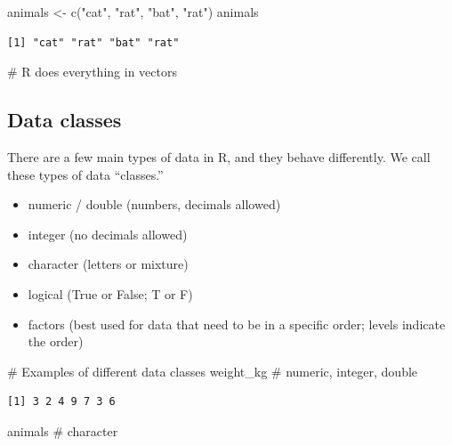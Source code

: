 \documentclass[
  letterpaper,
  DIV=11,
  numbers=noendperiod]{scrartcl}
\newenvironment{Shaded}{\begin{snugshade}}{\end{snugshade}}
\newcommand{\CommentTok}[1]{\textcolor[rgb]{0.37,0.37,0.37}{#1}}
\newcommand{\FunctionTok}[1]{\textcolor[rgb]{0.28,0.35,0.67}{#1}}
\newcommand{\NormalTok}[1]{\textcolor[rgb]{0.00,0.23,0.31}{#1}}
\newcommand{\OtherTok}[1]{\textcolor[rgb]{0.00,0.23,0.31}{#1}}
\newcommand{\StringTok}[1]{\textcolor[rgb]{0.13,0.47,0.30}{#1}}
\providecommand{\tightlist}{%
  \setlength{\itemsep}{0pt}\setlength{\parskip}{0pt}}
\begin{document}
\begin{Shaded}
\begin{Highlighting}[]
\NormalTok{animals }\OtherTok{\textless{}{-}} \FunctionTok{c}\NormalTok{(}\StringTok{"cat"}\NormalTok{, }\StringTok{"rat"}\NormalTok{, }\StringTok{"bat"}\NormalTok{, }\StringTok{"rat"}\NormalTok{)}
\NormalTok{animals}
\end{Highlighting}
\end{Shaded}

\begin{verbatim}
[1] "cat" "rat" "bat" "rat"
\end{verbatim}

\begin{Shaded}
\begin{Highlighting}[]
\CommentTok{\# R does everything in vectors}
\end{Highlighting}
\end{Shaded}

\subsection{Data classes}\label{data-classes}

There are a few main types of data in R, and they behave differently. We
call these types of data ``classes.''

\begin{itemize}
\tightlist
\item
  numeric / double (numbers, decimals allowed)
\item
  integer (no decimals allowed)
\item
  character (letters or mixture)
\item
  logical (True or False; T or F)
\item
  factors (best used for data that need to be in a specific order;
  levels indicate the order)
\end{itemize}

\begin{Shaded}
\begin{Highlighting}[]
\CommentTok{\# Examples of different data classes}
\NormalTok{weight\_kg   }\CommentTok{\# numeric, integer, double}
\end{Highlighting}
\end{Shaded}

\begin{verbatim}
[1] 3 2 4 9 7 3 6
\end{verbatim}

\begin{Shaded}
\begin{Highlighting}[]
\NormalTok{animals     }\CommentTok{\# character}
\end{Highlighting}
\end{Shaded}
\end{document}
